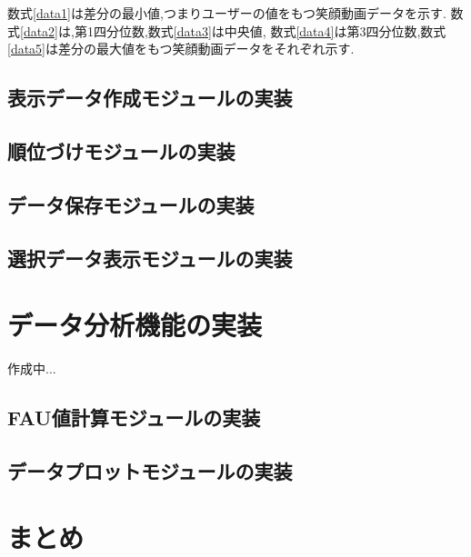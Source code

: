 数式\ref{data1}は差分の最小値,つまりユーザーの値をもつ笑顔動画データを示す.
数式\ref{data2}は,第1四分位数,数式\ref{data3}は中央値,
数式\ref{data4}は第3四分位数,数式\ref{data5}は差分の最大値をもつ笑顔動画データをそれぞれ示す.

\subsection{表示データ作成モジュールの実装}
\subsection{順位づけモジュールの実装}
\subsection{データ保存モジュールの実装}
\subsection{選択データ表示モジュールの実装}

\section{データ分析機能の実装}
作成中...
\subsection{FAU値計算モジュールの実装}
\subsection{データプロットモジュールの実装}
\section{まとめ}
